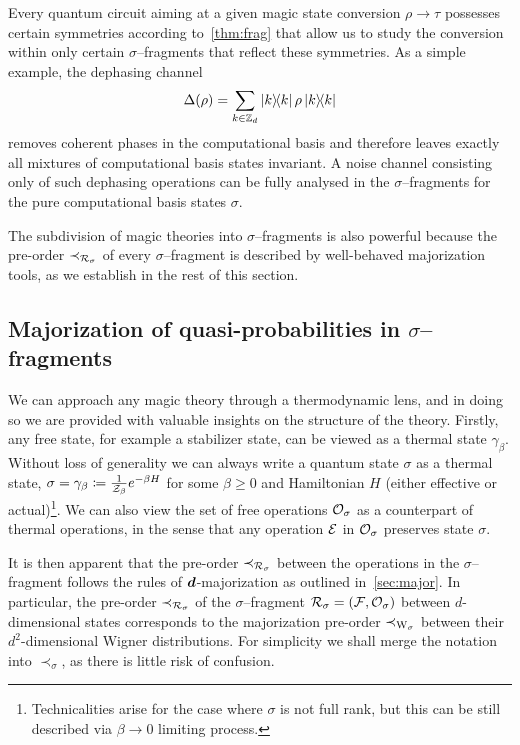 \documentclass[pra,
aps,
twocolumn,
superscriptaddress,
groupedaddress,
nofootinbib,
reprint
]{revtex4-1}
\begin{document}
Every  quantum circuit aiming at a given magic state conversion $\rho \longrightarrow \tau$ possesses certain symmetries according to~\cref{thm:frag} that allow us to study the conversion within only certain $\sigma$--fragments that reflect these symmetries.
As a simple example, the dephasing channel
\begin{equation}\label{eq:dephase}
	\Delta(\rho) = \sum_{k \in \mathbb{Z}_d} \ketbra{k}{k}\rho\ketbra{k}{k}
\end{equation}
removes coherent phases in the computational basis and therefore leaves exactly all mixtures of computational basis states invariant.
A noise channel consisting only of such dephasing operations can be fully analysed in the $\sigma$--fragments for the pure computational basis states $\sigma$. 

The subdivision of magic theories into $\sigma$--fragments is also powerful because the pre-order $\prec_{\mathcal{R}_\sigma}$ of every $\sigma$--fragment is described by well-behaved majorization tools, as we establish in the rest of this section.

\subsection{Majorization of quasi-probabilities in $\sigma$--fragments}\label{sec:major_frag}

We can approach any magic theory through a thermodynamic lens, and in doing so we are provided with valuable insights on the structure of the theory. 
Firstly, any free state, for example a stabilizer state, can be viewed as a thermal state $\gamma_\beta$.
Without loss of generality we can always write a quantum state $\sigma$ as a thermal state, $\sigma = \gamma_\beta \coloneqq \frac{1}{\mathcal{Z}_\beta} e^{-\beta H}$ for some $\beta \geq 0$ and Hamiltonian $H$ (either effective or actual)\footnote{Technicalities arise for the case where $\sigma$ is not full rank, but this can be still described via $ \beta \rightarrow 0$ limiting process.}.
We can also view the set of free operations $\mathcal{O}_\sigma$ as a counterpart of thermal operations, in the sense that any operation $\mathcal{E}$ in $\mathcal{O}_\sigma$ preserves state $\sigma$. 

It is then apparent that the pre-order $\prec_{\mathcal{R}_\sigma}$ between the operations in the $\sigma$--fragment follows the rules of $\bm{d}$-majorization as outlined in~\cref{sec:major}.
In particular, the pre-order $\prec_{\mathcal{R}_\sigma}$ of the $\sigma$--fragment $\mathcal{R}_\sigma = (\mathcal{F}, \mathcal{O}_\sigma)$ between $d$-dimensional states corresponds to the majorization pre-order $\prec_{\W{\sigma}}$ between their $d^2$-dimensional Wigner distributions.
For simplicity we shall merge the notation into $\prec_\sigma$, as there is little risk of confusion.
\end{document}

